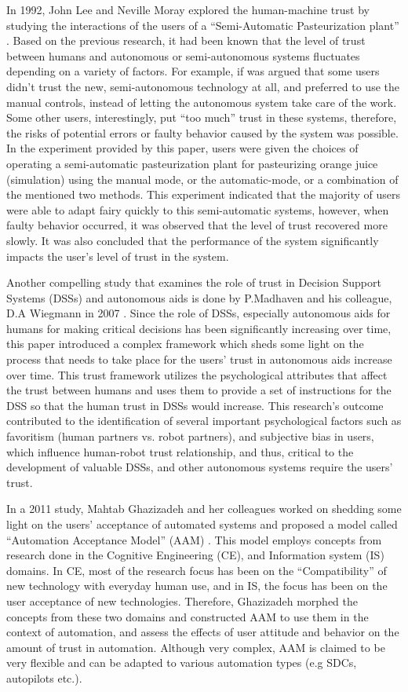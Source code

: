 \documentclass[runningheads,a4paper]{llncs}
\begin{document}
In 1992, John Lee and Neville Moray explored the human-machine trust by studying the interactions of the users of a ``Semi-Automatic Pasteurization plant'' \cite{lee1992trust}. Based on the previous research, it had been known that the level of trust between humans and autonomous or semi-autonomous systems fluctuates depending on a variety of factors. For example, if was argued that some users didn't trust the new, semi-autonomous technology at all, and preferred to use the manual controls, instead of letting the autonomous system take care of the work. Some other users, interestingly, put ``too much'' trust in these systems, therefore, the risks of potential errors or faulty behavior caused by the system was possible. In the experiment provided by this paper, users were given the choices of operating a semi-automatic pasteurization plant for pasteurizing orange juice (simulation) using the manual mode, or the automatic-mode, or a combination of the mentioned two methods. This experiment indicated that the majority of users were able to adapt fairy quickly to this semi-automatic systems, however, when faulty behavior occurred, it was observed that the level of trust recovered more slowly. It was also concluded that the performance of the system significantly impacts the user's level of trust in the system.

Another compelling study that examines the role of trust in Decision Support Systems (DSSs) and autonomous aids is done by P.Madhaven and his colleague, D.A Wiegmann in 2007 \cite{madhavan2007similarities}. Since the role of DSSs, especially autonomous aids for humans for making critical decisions has been significantly increasing over time, this paper introduced a complex framework which sheds some light on the process that needs to take place for the users' trust in autonomous aids increase over time. This trust framework utilizes the psychological attributes that affect the trust between humans and uses them to provide a set of instructions for the DSS so that the human trust in DSSs would increase. This research's outcome contributed to the identification of several important psychological factors such as favoritism (human partners vs. robot partners), and subjective bias in users, which influence human-robot trust relationship, and thus, critical to the development of valuable DSSs, and other autonomous systems require the users' trust.

In a 2011 study, Mahtab Ghazizadeh and her colleagues worked on shedding some light on the users' acceptance of automated systems and proposed a model called ``Automation Acceptance Model'' (AAM) \cite{ghazizadeh2012extending}. This model employs concepts from research done in the Cognitive Engineering (CE), and Information system (IS) domains. In CE, most of the research focus has been on the ``Compatibility'' of new technology with everyday human use, and in IS, the focus has been on the user acceptance of new technologies. Therefore, Ghazizadeh morphed the concepts from these two domains and constructed AAM to use them in the context of automation, and assess the effects of user attitude and behavior on the amount of trust in automation. Although very complex, AAM is claimed to be very flexible and can be adapted to various automation types (e.g SDCs, autopilots etc.).
\end{document}
